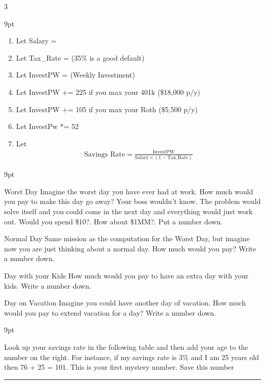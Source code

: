 \documentclass[landscape]{article}
\newcommand{\myline}{\vspace{4pt}\hrule  \vspace{4pt}}
\newenvironment{topic}[1]{
	\noindent \textbf{\textsc{\color{harvardcrimson}{#1}}}
	\noindent \hspace{-3.5pt}
}{
	\myline
}
\newenvironment{tellme}[1]{
	\noindent \textbf{\textit{\color{harvardblue}{#1}}}
	\begin{adjustwidth}{9pt}{}
	}{
	\end{adjustwidth}
}
\newenvironment{compactenum}{
	\begin{enumerate}[leftmargin=*,labelsep=5pt]
	}{
	\end{enumerate}
}
\newenvironment{compactdesc}{
	\begin{description}[leftmargin=1em,labelsep=0.7em, font=\normalfont\itshape]
	}{
	\end{description}
}
\begin{document}
\begin{multicols*}{3}
\begin{topic}{Numbers Game}
		\begin{tellme}{Compute the Savings Rate}
			\begin{compactenum}
				\item Let Salary = \blank
				\item Let Tax\_Rate = \blank (35\% is a good default)
				\item Let InvestPW = \blank (Weekly Investment)
				\item Let InvestPW += 225 if you max your 401k (\$18,000 p/y)
				\item Let InvestPW += 105 if you max your Roth (\$5,500 p/y)
				\item Let InvestPw *= 52
				\item Let 
				\begin{align*}
				\text{Savings Rate} = \frac{\text{InvestPW}}{\text{Salary} \times (1 - \text{Tax\_Rate})} 
				\end{align*}
			\end{compactenum}
		\end{tellme}
		\begin{tellme}{Computing the Cost of a Free Day}
			\begin{compactdesc}
				\item[Worst Day] Imagine the worst day you have ever had at work. How much would you pay to make this day go away? Your boss wouldn't know. The problem would solve itself and you could come in the next day and everything would just work out. Would you spend \$10?. How about \$1MM?. Put a number down. \blank
				\item[Normal Day] Same mission as the computation for the Worst Day, but imagine now you are just thinking about a normal day. How much would you pay? Write a number down. \blank
				\item[Day with your Kids] How much would you pay to have an extra day with your kids. Write a number down. \blank
				\item[Day on Vacation] Imagine you could have another day of vacation. How much would you pay to extend vacation for a day? Write a number down. \blank  
			\end{compactdesc}
		\end{tellme}
		\begin{tellme}{Computing Mystery Number One}
			Look up your savings rate in the following table and then add your age to the number on the right. For instance, if my savings rate is 3\% and I am 25 years old then 76 + 25 = 101. This is your first mystery number. Save this number \blank

\end{tellme}
\end{topic}
\end{multicols*}
\end{document}
